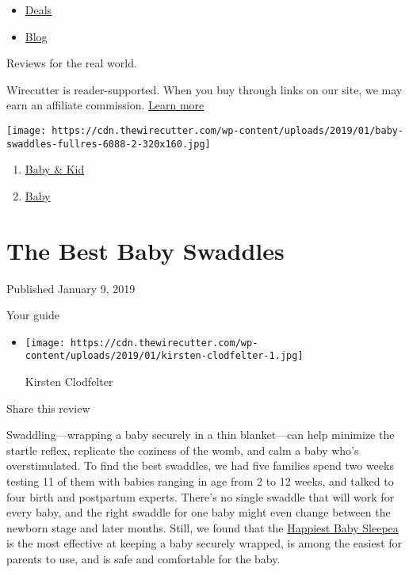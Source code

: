 \begin{itemize}
\tightlist
\item
  \href{/wirecutter/deals/}{Deals}
\item
  \href{/wirecutter/blog/}{Blog}
\end{itemize}

Reviews for the real world.

Wirecutter is reader-supported. When you buy through links on our site,
we may earn an affiliate commission. \href{/wirecutter/about/}{Learn
more}

\texttt{[image: https://cdn.thewirecutter.com/wp-content/uploads/2019/01/baby-swaddles-fullres-6088-2-320x160.jpg]}

\begin{enumerate}
\def\labelenumi{\arabic{enumi}.}
\tightlist
\item
  \href{/wirecutter/baby-kid/}{Baby \& Kid}
\item
  \href{/wirecutter/baby-kid/baby/}{Baby}
\end{enumerate}

\hypertarget{the-best-baby-swaddles}{%
\section{The Best Baby Swaddles}\label{the-best-baby-swaddles}}

Published January 9, 2019

Your guide

\begin{itemize}
\item
  \texttt{[image: https://cdn.thewirecutter.com/wp-content/uploads/2019/01/kirsten-clodfelter-1.jpg]}

  Kirsten Clodfelter
\end{itemize}

Share this review

Swaddling---wrapping a baby securely in a thin blanket---can help
minimize the startle reflex, replicate the coziness of the womb, and
calm a baby who's overstimulated. To find the best swaddles, we had five
families spend two weeks testing 11 of them with babies ranging in age
from 2 to 12 weeks, and talked to four birth and postpartum experts.
There's no single swaddle that will work for every baby, and the right
swaddle for one baby might even change between the newborn stage and
later months. Still, we found that the
\href{https://www.nytimes3xbfgragh.onion/wirecutter/out/link/30686/162165/4/86635/?merchant=BuyBuy\%20Baby}{Happiest
Baby Sleepea} is the most effective at keeping a baby securely wrapped,
is among the easiest for parents to use, and is safe and comfortable for
the baby.

